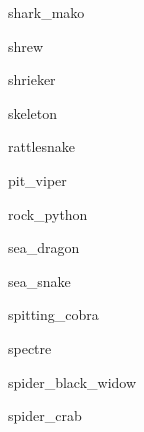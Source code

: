 \documentclass[letterpaper,serif]{module}
\begin{document}
\begin{newmonster}{shark_mako}\end{newmonster}

\begin{newmonster}{shrew}\end{newmonster}

\begin{newmonster}{shrieker}\end{newmonster}

\begin{newmonster}{skeleton}\end{newmonster}

\begin{newmonster}{rattlesnake}\end{newmonster}

\begin{newmonster}{pit_viper}\end{newmonster}

\begin{newmonster}{rock_python}\end{newmonster}

\begin{newmonster}{sea_dragon}\end{newmonster}

\begin{newmonster}{sea_snake}\end{newmonster}

\begin{newmonster}{spitting_cobra}\end{newmonster}

\begin{newmonster}{spectre}\end{newmonster}

\begin{newmonster}{spider_black_widow}\end{newmonster}

\begin{newmonster}{spider_crab}\end{newmonster}
\end{document}
